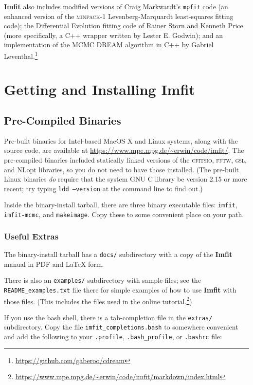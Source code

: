 \documentclass[10pt,a4paper,article]{memoir}
\newcommand{\Imfit}{\textbf{Imfit}}
\newcommand{\imfitprog}{\texttt{imfit}}
\newcommand{\imfitmcmc}{\texttt{imfit-mcmc}}
\newcommand{\makeimage}{\texttt{makeimage}}
\begin{document}
\Imfit{} also includes modified versions of Craig Markwardt's
\texttt{mpfit} code (an enhanced version of the \textsc{minpack-1}
Levenberg-Marquardt least-squares fitting code); the Differential
Evolution fitting code of Rainer Storn and Kenneth Price (more
specifically, a C++ wrapper written by Lester E. Godwin); and
an implementation of the MCMC DREAM algorithm in C++ by Gabriel 
Leventhal.\footnote{\url{https://github.com/gaberoo/cdream}}



\newpage

\chapter{Getting and Installing \Imfit{}}

\section{Pre-Compiled Binaries}

Pre-built binaries for Intel-based MacOS X and Linux systems, along with
the source code, are available at
\url{https://www.mpe.mpg.de/~erwin/code/imfit/}. The pre-compiled
binaries included statically linked versions of the \textsc{cfitsio},
\textsc{fftw}, \textsc{gsl}, and NLopt libraries, so you do not need to
have those installed. (The pre-built Linux binaries \textit{do} require
that the system GNU C library be version 2.15 or more recent; try typing
\texttt{ldd --version} at the command line to find out.)

Inside the binary-install tarball, there are three binary executable
files: \imfitprog, \imfitmcmc, and \makeimage{}. Copy these to some
convenient place on your path.

\subsection{Useful Extras}

The binary-install tarball has a \texttt{docs/} subdirectory with a
copy of the \Imfit{} manual in PDF and \LaTeX{} form.

There is also an \texttt{examples/} subdirectory with sample files; see
the \texttt{README\_examples.txt} file there for simple examples of how
to use \Imfit{} with those files. (This includes the files used in the 
online tutorial.\footnote{\url{https://www.mpe.mpg.de/~erwin/code/imfit/markdown/index.html}})

If you use the bash shell, there is a tab-completion file in the
\texttt{extras/} subdirectory. Copy the file \texttt{imfit\_completions.bash}
to somewhere convenient and 
add the following to your \texttt{.profile}, \texttt{.bash\_profile}, or 
\texttt{.bashrc} file:
\end{document}
